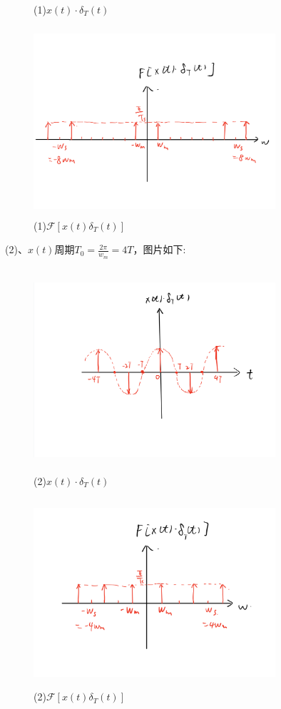 \documentclass[answers]{exam}
\begin{document}
\begin{questions}
\begin{figure}[h]
	\caption{(1)$x(t)\cdot\delta_T(t)$}
\end{figure}
\begin{figure}[h]
	\centering
	\includegraphics[width=0.8\textwidth,height=7cm]{pics/p2-1-2.PNG}
	\caption{(1)$\mathcal{F}[x(t)\delta_T(t)]$}
\end{figure}


\newpage
(2)、$x(t)$周期$T_0=\frac{2\pi}{w_m}=4T$，图片如下:\\
\begin{figure}[h]
	\centering
	\includegraphics[width=0.8\textwidth,height=7.5cm]{pics/p2-2-1.PNG}
	\caption{(2)$x(t)\cdot\delta_T(t)$}
\end{figure}
\begin{figure}[h]
	\centering
	\includegraphics[width=0.8\textwidth,height=7cm]{pics/p2-2-2.PNG}
	\caption{(2)$\mathcal{F}[x(t)\delta_T(t)]$}
\end{figure}


\end{questions}
\end{document}
